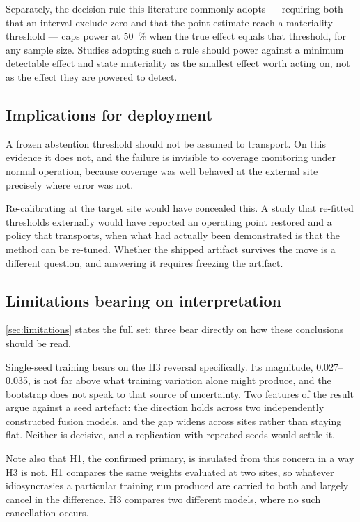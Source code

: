 Separately, the decision rule this literature commonly adopts --- requiring both
that an interval exclude zero and that the point estimate reach a materiality
threshold --- caps power at \SI{50}{\percent} when the true effect equals that
threshold, for any sample size. Studies adopting such a rule should power
against a minimum detectable effect and state materiality as the smallest effect
worth acting on, not as the effect they are powered to detect.

\subsection{Implications for deployment}

A frozen abstention threshold should not be assumed to transport. On this
evidence it does not, and the failure is invisible to coverage monitoring under
normal operation, because coverage was well behaved at the external site
precisely where error was not.

Re-calibrating at the target site would have concealed this. A study that
re-fitted thresholds externally would have reported an operating point restored
and a policy that transports, when what had actually been demonstrated is that
the method can be re-tuned. Whether the shipped artifact survives the move is a
different question, and answering it requires freezing the artifact.

\subsection{Limitations bearing on interpretation}

\cref{sec:limitations} states the full set; three bear directly on how these
conclusions should be read.

Single-seed training bears on the H3 reversal specifically. Its magnitude,
\numrange{0.027}{0.035}, is not far above what training variation alone might
produce, and the bootstrap does not speak to that source of uncertainty. Two
features of the result argue against a seed artefact: the direction holds across
two independently constructed fusion models, and the gap widens across sites
rather than staying flat. Neither is decisive, and a replication with repeated
seeds would settle it.

Note also that H1, the confirmed primary, is insulated from this concern in a
way H3 is not. H1 compares the same weights evaluated at two sites, so whatever
idiosyncrasies a particular training run produced are carried to both and
largely cancel in the difference. H3 compares two different models, where no
such cancellation occurs.

